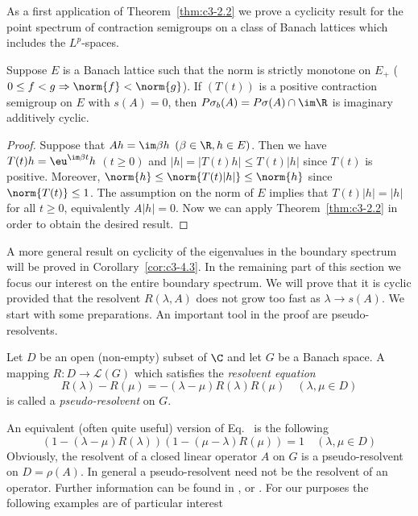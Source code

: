 As a first application of Theorem~\ref{thm:c3-2.2} we prove a cyclicity result for the point spectrum of contraction semigroups on a class of Banach lattices which includes the $L^p$-spaces.

\begin{corollary}\label{cor:c3-2.3}
	Suppose $E$ is a Banach lattice such that the norm is strictly monotone on $E_{+}$ (\ie  $0 \leq f < g \Rightarrow \norm{f} < \norm{g}$).
	If\/ $(T(t))$ is a positive contraction semigroup on $E$ with $s(A) = 0$, then $P\sigma_{b}(A) = P\sigma(A) \cap \im\R $ is imaginary additively cyclic.
\end{corollary}
\begin{proof}
	Suppose that $Ah = \im\beta  h$ $(\beta \in \R , h \in E)$.
	Then we have $T(t)h = \eu^{\im\beta  t}h$ $(t \geq 0)$ and $|h| = |T(t)h| \leq T(t)|h|$ since $T(t)$ is positive.
Moreover, $\norm{h} \leq \norm{T(t)|h|} \leq \norm{h}$ since $\norm{T(t)} \leq 1$.	
The assumption on the norm of\/ $E$ implies that $T(t)|h| = |h|$ for all $t \geq 0$, equivalently $A|h| = 0$.
	Now we can apply Theorem~\ref{thm:c3-2.2} in order to obtain the desired result.
\end{proof}
A more general result on cyclicity of the eigenvalues in the boundary spectrum%
will be proved in Corollary~\ref{cor:c3-4.3}.
In the remaining part of this section we focus our interest on the entire boundary spectrum.
We will prove that it is cyclic 
provided that the resolvent $R(\lambda,A)$ does not grow too fast as $\lambda \to s(A)$.
We start with some preparations.
An important tool in the proof are pseudo-resolvents.
\begin{definition}\label{def:c3-2.4}
	Let $D$ be an open (non-empty) subset of\/ $\C $ and let $G$ be a Banach space.
	A mapping $R \colon D \to \mathcal{L}(G)$ which satisfies the \emph{resolvent equation}
	\begin{equation}\label{eq:c3-2.8}
		R(\lambda) - R(\mu) = -(\lambda - \mu)R(\lambda)R(\mu) \quad (\lambda,\mu \in D)
	\end{equation}
	is called a \emph{pseudo-resolvent} on $G$.
\end{definition}
An equivalent (often quite useful) version of Eq.~ is the following
\begin{equation}\label{eq:c3-2.9}
	(1 - (\lambda - \mu)R(\lambda))(1 - (\mu - \lambda)R(\mu)) = 1 \quad (\lambda,\mu \in D)
\end{equation}
Obviously, the resolvent of a closed linear operator $A$ on $G$ is a pseudo-resolvent on $D = \rho(A)$.
In general a pseudo-resolvent need not be the resolvent of an operator.
Further information can be found in \textcite{hillephillips:1957}, \textcite{pazy:1983} or \textcite{yosida:1965}.
For our purposes the following examples are of particular interest

